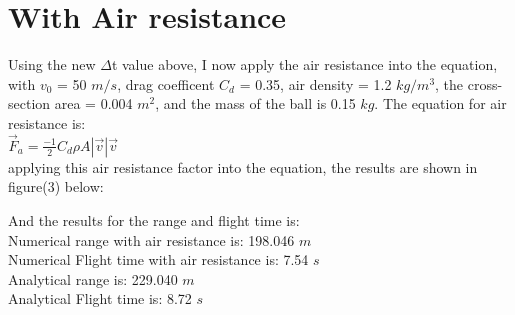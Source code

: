 \documentclass{article}
\begin{document}
\begin{figure}[H]
\end{figure}

\section{With Air resistance}
Using the new $\Delta$t value above, I now apply the air resistance into the equation, with $v_0$ = 50 $m/s$, drag coefficent $C_d$ = 0.35, air density = 1.2 $kg/m^3$, the cross-section area = 0.004 $m^2$, and the mass of the ball is 0.15 $kg$. The equation for air resistance is: \\
\indent \indent \indent $\vec{F}_a = \frac{-1}{2}C_d$$\rho A |\vec{v}|\vec{v}$\\
applying this air resistance factor into the equation, the results are shown in figure(3) below:
\begin{figure}[H]
\end{figure}
And the results for the range and flight time is:\\
Numerical range with air resistance is:  198.046 $m$\\
Numerical Flight time with air resistance is:  7.54 $s$\\
Analytical range is:  229.040 $m$\\
Analytical Flight time is:  8.72 $s$\\
\end{document}
